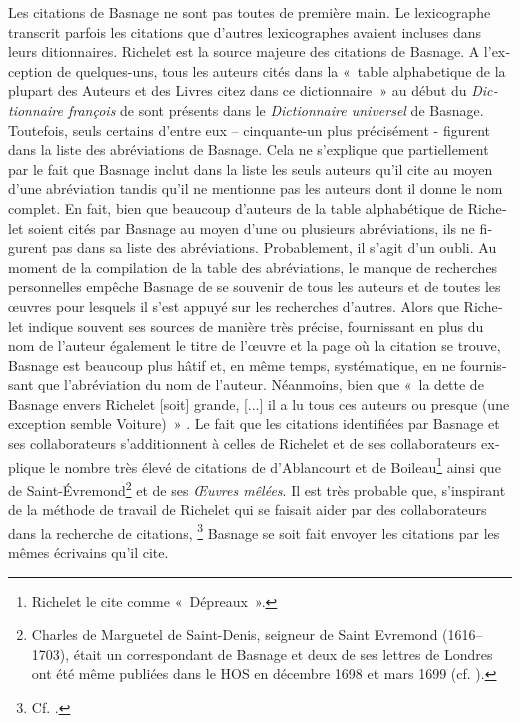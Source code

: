 \documentclass[output=paper,colorlinks,citecolor=brown,arabicfont,chinesefont,booklanguage=french]{langscibook}
\begin{document}
\begin{otherlanguage}{french}
Les citations de Basnage ne sont pas toutes de première main. Le lexicographe transcrit parfois les citations que d’autres lexicographes avaient incluses dans leurs ditionnaires. Richelet est la source majeure des citations de Basnage. A l'exception de quelques-uns, tous les auteurs cités dans la «~table alphabetique de la plupart des Auteurs et des Livres citez dans ce dictionnaire~» au début du \emph{Dictionnaire françois} de \citet{Richelet1693} sont présents dans le \emph{Dictionnaire universel} de Basnage. Toutefois, seuls certains d'entre eux – cinquante-un plus précisément - figurent dans la liste des abréviations de Basnage. Cela ne s'explique que partiellement par le fait que Basnage inclut dans la liste les seuls auteurs qu'il cite au moyen d'une abréviation tandis qu’il ne mentionne pas les auteurs dont il donne le nom complet. En fait, bien que beaucoup d’auteurs de la table alphabétique de Richelet soient cités par Basnage au moyen d'une ou plusieurs abréviations, ils ne figurent pas dans sa liste des abréviations. Probablement, il s'agit d'un oubli. Au moment de la compilation de la table des abréviations, le manque de recherches personnelles empêche Basnage de se souvenir de tous les auteurs et de toutes les œuvres pour lesquels il s'est appuyé sur les recherches d’autres. Alors que Richelet indique souvent ses sources de manière très précise, fournissant en plus du nom de l'auteur également le titre de l'œuvre et la page où la citation se trouve, Basnage est beaucoup plus hâtif et, en même temps, systématique, en ne fournissant que l'abréviation du nom de l'auteur. Néanmoins, bien que «~la dette de Basnage envers Richelet [soit] grande, [...] il a lu tous ces auteurs ou presque (une exception semble Voiture)~» \citep[86]{Fennis1988}. Le fait que les citations identifiées par Basnage et ses collaborateurs s'additionnent à celles de Richelet et de ses collaborateurs explique le nombre très élevé de citations de d'Ablancourt et de Boileau\footnote{Richelet le cite comme «~Dépreaux~».} ainsi que de Saint-Évremond\footnote{Charles de Marguetel de Saint-Denis, seigneur de Saint Evremond (1616--1703), était un correspondant de Basnage et deux de ses lettres de Londres ont été même publiées dans le HOS en décembre 1698 et mars 1699 (cf. \citealt[743]{Graveleau2018}).} et de ses \emph{Œuvres mêlées}. Il est très probable que, s'inspirant de la méthode de travail de Richelet qui se faisait aider par des collaborateurs dans la recherche de citations, \footnote{Cf. \citealt[543]{Quemada1967}.} Basnage se soit fait envoyer les citations par les mêmes écrivains qu’il cite.


\end{otherlanguage}
\end{document}
